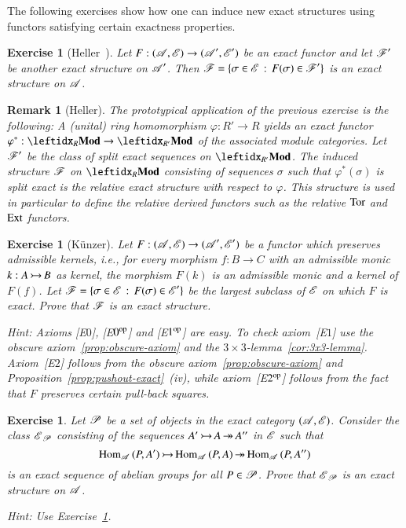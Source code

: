\documentclass[1p]{elsarticle}
\theoremstyle{mythm}
\theoremstyle{mydef}
\newtheorem{Exer}[Thm]{Exercise}
\newtheorem{Rem}[Thm]{Remark}
\begin{document}
The following exercises show how one can induce new exact structures
using functors satisfying certain exactness properties.

\begin{Exer}[{Heller~\cite[7.3]{MR0100622}}]
  \label{exer:pull-back-ex-str}
  Let $F: (\operatorname{\mathscr{A}},\operatorname{\mathscr{E}}) \to (\operatorname{\mathscr{A}}',\operatorname{\mathscr{E}}')$ be an exact
  functor and let $\operatorname{\mathscr{F}}'$ be another exact structure on
  $\operatorname{\mathscr{A}}'$. Then $\operatorname{\mathscr{F}} = \{\sigma \in \operatorname{\mathscr{E}}\,:\,F(\sigma) \in
  \operatorname{\mathscr{F}}'\}$ is an exact structure on $\operatorname{\mathscr{A}}$.
\end{Exer}

\begin{Rem}[Heller]
  The prototypical application of the previous exercise is the following: 
  A (unital) ring homomorphism $\varphi: R' \to R$ yields an exact functor
  $\varphi^{\ast}: \leftidx_{{R}}{\Mod} \to \leftidx_{{R'}}{\Mod}$ of the
  associated module categories. Let $\operatorname{\mathscr{F}}'$ be the class of split
  exact sequences on $\leftidx_{{R'}}{\Mod}$. The induced structure
  $\operatorname{\mathscr{F}}$ on $\leftidx_{R}{\Mod}$
  consisting of sequences $\sigma$ such that $\varphi^{\ast}(\sigma)$
  is split exact is the \emph{relative exact structure} with respect
  to $\varphi$. This structure is used in particular to define the
  relative derived functors such as the relative $\operatorname{Tor}$ and $\operatorname{Ext}$ functors.
\end{Rem}

\begin{Exer}[K\"unzer]
  \label{exer:largest-ex-structure-fct-ex}
  Let $F: (\operatorname{\mathscr{A}}, \operatorname{\mathscr{E}}) \to (\operatorname{\mathscr{A}}',\operatorname{\mathscr{E}}')$ be a functor which preserves
  admissible kernels, i.e., for every morphism
  $f:B \to C$ with an admissible monic $k: A \operatorname{\rightarrowtail} B$
  as kernel, the morphism $F(k)$ is an admissible monic and a kernel of
  $F(f)$. Let $\operatorname{\mathscr{F}} = \{\sigma \in \operatorname{\mathscr{E}}\,:\,F(\sigma) \in \operatorname{\mathscr{E}}'\}$
  be the largest subclass of $\operatorname{\mathscr{E}}$ on which $F$ is exact. Prove that
  $\operatorname{\mathscr{F}}$ is an exact structure.

  \emph{Hint:} Axioms [E$0$], [E$0^{\operatorname{op}}$] and [E$1^{\operatorname{op}}$] are easy.
  To check axiom~[E$1$] use the 
  obscure axiom~\ref{prop:obscure-axiom} and the
  $3 \times 3$-lemma~\ref{cor:3x3-lemma}. 
  Axiom~[E$2$] follows from the obscure axiom~\ref{prop:obscure-axiom} and
  Proposition~\ref{prop:pushout-exact}~(iv),
  while axiom~[E$2^{\operatorname{op}}$] follows from the fact that $F$ preserves
  certain pull-back squares. 
\end{Exer}

\begin{Exer}
  Let $\operatorname{\mathscr{P}}$ be a set of objects in the exact category
  $(\operatorname{\mathscr{A}},\operatorname{\mathscr{E}})$. Consider the class $\operatorname{\mathscr{E}}_{\operatorname{\mathscr{P}}}$ consisting of the
  sequences $A' \operatorname{\rightarrowtail} A \operatorname{\twoheadrightarrow} A''$ in $\operatorname{\mathscr{E}}$ such that
  \[
  \operatorname{Hom}_{\operatorname{\mathscr{A}}}{(P,A')} \operatorname{\rightarrowtail} \operatorname{Hom}_{\operatorname{\mathscr{A}}}{(P,A)} \operatorname{\twoheadrightarrow} \operatorname{Hom}_{\operatorname{\mathscr{A}}}{(P,A'')}
  \]
  is an exact sequence of abelian groups for all $P \in \operatorname{\mathscr{P}}$.
  Prove that $\operatorname{\mathscr{E}}_{\operatorname{\mathscr{P}}}$
  is an exact structure on $\operatorname{\mathscr{A}}$.

  \emph{Hint:} Use Exercise~\ref{exer:largest-ex-structure-fct-ex}.
\end{Exer}
\end{document}
